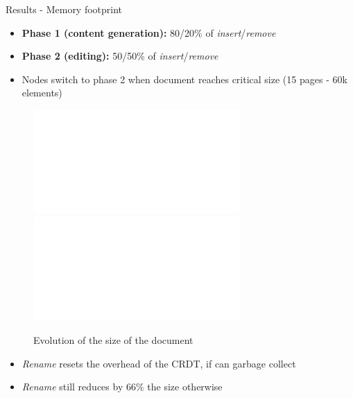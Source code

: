 \documentclass[10pt]{beamer}
\begin{document}
\begin{frame}{Results - Memory footprint}
  \begin{itemize}
    \item \textbf{Phase 1 (content generation):} 80/20\% of \emph{insert}/\emph{remove}
    \item \textbf{Phase 2 (editing):} 50/50\% of \emph{insert}/\emph{remove}
    \item Nodes switch to phase 2 when document reaches critical size (15 pages - 60k elements)
  \end{itemize}

  \begin{figure}
    \centering
    \includegraphics<2>[width=0.7\textwidth]{img/snapshots-sizes-2.pdf}
    \includegraphics<3>[width=0.7\textwidth]{img/snapshots-sizes.pdf}
    \caption{Evolution of the size of the document}
    \label{fig:evolution-document-size}
  \end{figure}

  \vspace{-1\baselineskip}
  \begin{itemize}
    \item<2-> \emph{Rename} resets the overhead of the CRDT, if can garbage collect
    \item<3> \emph{Rename} still reduces by $66\%$ the size otherwise
  \end{itemize}
\end{frame}
\end{document}
